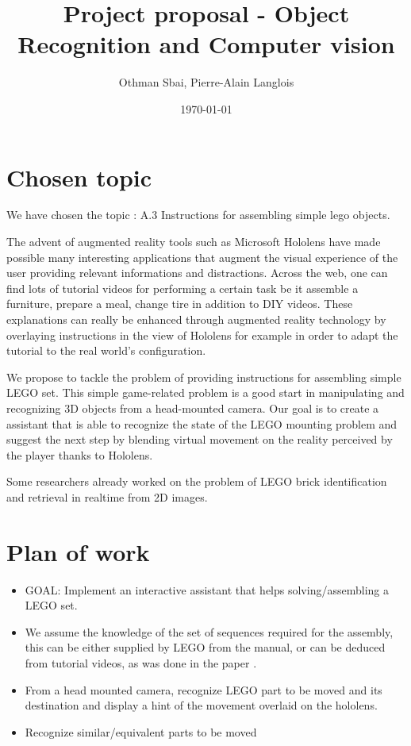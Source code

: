 \documentclass[a4paper,10pt]{article}
\title{Project proposal - Object Recognition and Computer vision}
\author{Othman Sbai, Pierre-Alain Langlois}
\date\today
\begin{document}
\maketitle

\section{Chosen topic}
We have chosen the topic : A.3 Instructions for assembling simple lego objects.

\medbreak
The advent of augmented reality tools such as Microsoft Hololens have made possible many interesting 
applications that augment the visual experience of the user providing relevant informations and 
distractions. Across the web, one can find lots of tutorial videos for performing a certain task be it 
assemble a furniture, prepare a meal, change tire in addition to DIY videos. These explanations can 
really be enhanced through augmented reality technology by overlaying instructions in the view of Hololens 
for example in order to adapt the tutorial to the real world’s configuration. 
\medbreak

We propose to tackle the problem of providing instructions for assembling simple LEGO set. This simple 
game-related problem is a good start in manipulating and recognizing 3D objects from a head-mounted camera. 
Our goal is to create a assistant that is able to recognize the state of the LEGO mounting problem and 
suggest the next step by blending virtual movement on the reality perceived by the player thanks to 
Hololens.

\medbreak
Some researchers already worked on the problem of LEGO brick identification and retrieval in realtime from 
2D images\cite{botha_realtime_2009}.
 
\section{Plan of work}

\begin{itemize}
 \item GOAL: Implement an interactive assistant that helps solving/assembling a LEGO set.
 \item We assume the knowledge of the set of sequences required for the assembly, this can be either 
 supplied by LEGO from the manual, or can be deduced from tutorial videos, as was done in the paper 
 \cite{alayrac_unsupervised_2015}.
 \item From a head mounted camera, recognize LEGO part to be moved and its destination and display a 
 hint of the movement overlaid on the hololens.
 \item Recognize similar/equivalent parts to be moved

\end{itemize}
\end{document}
